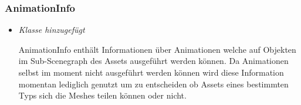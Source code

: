 \subsubsection{AnimationInfo}
\begin{itemize}
    \item \textit{Klasse hinzugefügt}
        \begin{leftbar}[0.9\linewidth]
            AnimationInfo enthält Informationen über Animationen welche auf Objekten im Sub-Scenegraph des
            Assets ausgeführt werden können. Da Animationen selbst im moment nicht ausgeführt werden können
            wird diese Information momentan lediglich genutzt um zu entscheiden ob Assets eines bestimmten
            Typs sich die Meshes teilen können oder nicht.
        \end{leftbar}
\end{itemize}